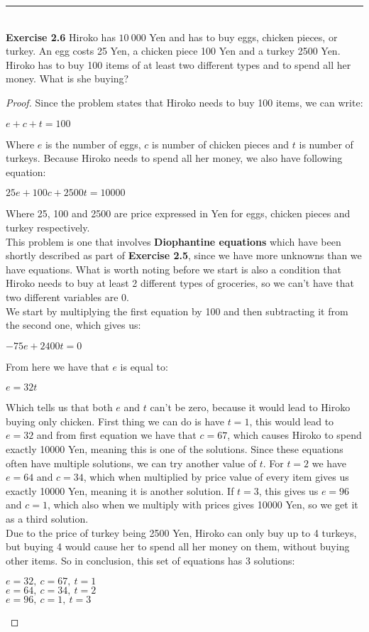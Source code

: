 \documentclass{article}
\begin{document}
\noindent\rule{12cm}{0.4pt}\\
\noindent \textbf{Exercise 2.6} Hiroko has $10\ 000$ Yen and has to buy eggs, chicken pieces, or turkey. An egg costs 25 Yen, a chicken piece 100 Yen and a turkey 2500 Yen. Hiroko has to buy 100 items of at least two different types and to spend all her money. What is she buying?
\begin{proof}
Since the problem states that Hiroko needs to buy 100 items, we can write:
\begin{center}
$e+c+t = 100$	
\end{center}
Where $e$ is the number of eggs, $c$ is number of chicken pieces and $t$ is number of turkeys. Because Hiroko needs to spend all her money, we also have following equation:
\begin{center}
$25e+100c+2500t=10000$	
\end{center}
Where 25, 100 and 2500 are price expressed in Yen for eggs, chicken pieces and turkey respectively.\\
This problem is one that involves \textbf{Diophantine equations} which have been shortly described as part of \textbf{Exercise 2.5}, since we have more unknowns than we have equations. What is worth noting before we start is also a condition that Hiroko needs to buy at least 2 different types of groceries, so we can't have that two different variables are 0.\\
We start by multiplying the first equation by 100 and then subtracting it from the second one, which gives us:
\begin{center}
$-75e+2400t = 0$	
\end{center}
From here we have that $e$ is equal to:
\begin{center}
$e = 32t$	
\end{center}
Which tells us that both $e$ and $t$ can't be zero, because it would lead to Hiroko buying only chicken. First thing we can do is have $t=1$, this would lead to $e=32$ and from first equation we have that $c=67$, which causes Hiroko to spend exactly 10000 Yen, meaning this is one of the solutions. Since these equations often have multiple solutions, we can try another value of $t$. For $t=2$ we have $e=64$ and $c=34$, which when multiplied by price value of every item gives us exactly 10000 Yen, meaning it is another solution. If $t=3$, this gives us $e=96$ and $c=1$, which also when we multiply with prices gives 10000 Yen, so we get it as a third solution.\\
Due to the price of turkey being 2500 Yen, Hiroko can only buy up to 4 turkeys, but buying 4 would cause her to spend all her money on them, without buying other items. So in conclusion, this set of equations has 3 solutions:
\begin{center}
$e=32,\ c=67,\ t=1$\\
$e=64,\ c=34,\ t=2$\\
$e=96,\ c=1,\ t=3$	
\end{center}
\end{proof}
\end{document}

